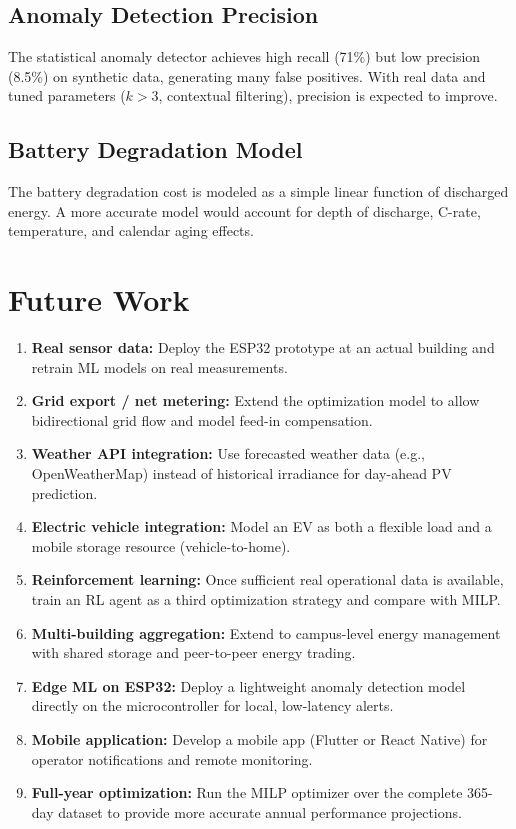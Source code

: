 \subsection{Anomaly Detection Precision}

The statistical anomaly detector achieves high recall (71\%) but low precision (8.5\%) on synthetic data, generating many false positives. With real data and tuned parameters ($k > 3$, contextual filtering), precision is expected to improve.

\subsection{Battery Degradation Model}

The battery degradation cost is modeled as a simple linear function of discharged energy. A more accurate model would account for depth of discharge, C-rate, temperature, and calendar aging effects.

\section{Future Work}

\begin{enumerate}
    \item \textbf{Real sensor data:} Deploy the ESP32 prototype at an actual building and retrain ML models on real measurements.

    \item \textbf{Grid export / net metering:} Extend the optimization model to allow bidirectional grid flow and model feed-in compensation.

    \item \textbf{Weather API integration:} Use forecasted weather data (e.g., OpenWeatherMap) instead of historical irradiance for day-ahead PV prediction.

    \item \textbf{Electric vehicle integration:} Model an EV as both a flexible load and a mobile storage resource (vehicle-to-home).

    \item \textbf{Reinforcement learning:} Once sufficient real operational data is available, train an RL agent as a third optimization strategy and compare with MILP.

    \item \textbf{Multi-building aggregation:} Extend to campus-level energy management with shared storage and peer-to-peer energy trading.

    \item \textbf{Edge ML on ESP32:} Deploy a lightweight anomaly detection model directly on the microcontroller for local, low-latency alerts.

    \item \textbf{Mobile application:} Develop a mobile app (Flutter or React Native) for operator notifications and remote monitoring.

    \item \textbf{Full-year optimization:} Run the MILP optimizer over the complete 365-day dataset to provide more accurate annual performance projections.
\end{enumerate}
